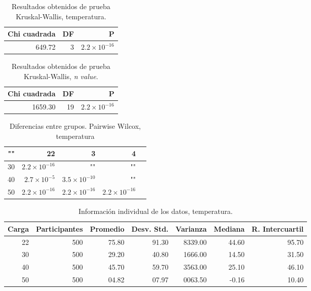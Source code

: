 \documentclass{elsarticle}
\begin{document}
\begin{table}[ht]
    \centering
    \caption{Resultados obtenidos de prueba Kruskal-Wallis, temperatura.} 
    \begin{tabular}{|r|r|r|}
    \hline
    Chi cuadrada & DF & P  \\
    \hline
    649.72 & 3 & $2.2\times 10^{-16}$ \\
    \hline
\end{tabular}
    \label{cuadro 3}
\end{table}
\begin{table}[ht]
    \centering
    \caption{Resultados obtenidos de prueba Kruskal-Wallis, \textit{n value}.} 
    \begin{tabular}{|r|r|r|}
    \hline
    Chi cuadrada & DF & P  \\
    \hline
    1659.30 & 19 & $2.2\times 10^{-16}$ \\
    \hline
\end{tabular}
    \label{cuadro 4}
\end{table}

\begin{table}[htb]
    \centering
    \caption{Diferencias entre grupos. Pairwise Wilcox, temperatura} 
    \begin{tabular}{|r|r|r|r|r|}
    \hline
    "" & 22 & 3 & 4 \\
    \hline
    30 & $2.2\times 10^{-16}$ & "" & "" \\
    \hline
    40 & $2.7\times 10^{-5}$ & $3.5\times 10^{-10}$  & "" \\
    \hline
    50 & $2.2\times 10^{-16}$ & $2.2\times 10^{-16}$ & $2.2\times 10^{-16}$ \\
    \hline
    \end{tabular}
    \label{cuadro 5}
\end{table}

\begin{table}[htb]
    \centering
    \caption{Informaci\'on individual de los datos, temperatura.} 
    \begin{tabular}{|r|r|r|r|r|r|r|}
    \hline
    Carga & Participantes & Promedio & Desv. Std. & Varianza & Mediana & R. Intercuartil  \\
    \hline
    22 & 500 & 75.80 & 91.30 & 8339.00 & 44.60 & 95.70 \\
    \hline
    30 & 500 & 29.20 & 40.80 & 1666.00 & 14.50 & 31.50 \\
    \hline
    40 & 500 & 45.70 & 59.70 & 3563.00 & 25.10 & 46.10 \\
    \hline
    50 & 500 & 04.82 & 07.97 & 0063.50 & -0.16 & 10.40 \\
    \hline
\end{tabular}
    \label{cuadro 6}
\end{table}
\end{document}
